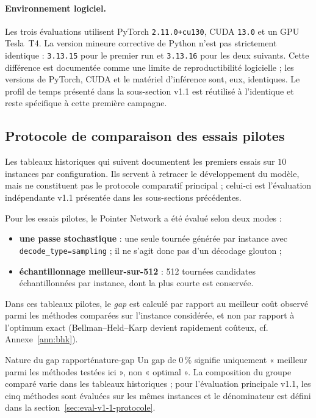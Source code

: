 \documentclass[12pt, a4paper, twoside, openright]{book}
\begin{document}
\paragraph{Environnement logiciel.}
Les trois évaluations utilisent PyTorch \texttt{2.11.0+cu130}, CUDA
\texttt{13.0} et un GPU Tesla~T4. La version mineure corrective de Python
n'est pas strictement identique : \texttt{3.13.15} pour le premier run et
\texttt{3.13.16} pour les deux suivants. Cette différence est documentée
comme une limite de reproductibilité logicielle ; les versions de PyTorch,
CUDA et le matériel d'inférence sont, eux, identiques. Le profil de temps
présenté dans la sous-section v1.1 est réutilisé à l'identique et reste
spécifique à cette première campagne.


\subsection{Protocole de comparaison des essais pilotes}

Les tableaux historiques qui suivent documentent les premiers essais sur
$10$ instances par configuration. Ils servent à retracer le développement du
modèle, mais ne constituent pas le protocole comparatif principal ; celui-ci
est l'évaluation indépendante v1.1 présentée dans les sous-sections précédentes.

Pour les essais pilotes, le Pointer Network a été évalué selon deux modes :
\begin{itemize}
\item \textbf{une passe stochastique} : une seule tournée générée par instance
avec \texttt{decode\_type=sampling} ; il ne s'agit donc pas d'un décodage glouton ;
\item \textbf{échantillonnage meilleur-sur-512} : 512 tournées candidates
échantillonnées par instance, dont la plus courte est conservée.
\end{itemize}

Dans ces tableaux pilotes, le \emph{gap} est calculé par rapport au meilleur
coût observé parmi les méthodes comparées sur l'instance considérée, et non par
rapport à l'optimum exact (Bellman--Held--Karp devient rapidement coûteux,
cf. Annexe~\ref{ann:bhk}).

\begin{remark}{Nature du gap rapporté}{nature-gap}
Un gap de $0\,\%$ signifie uniquement « meilleur parmi les méthodes testées ici »,
non « optimal ». La composition du groupe comparé varie dans les tableaux
historiques ; pour l'évaluation principale v1.1, les cinq méthodes sont évaluées
sur les mêmes instances et le dénominateur est défini dans la
section~\ref{sec:eval-v1-1-protocole}.
\end{remark}
\end{document}
